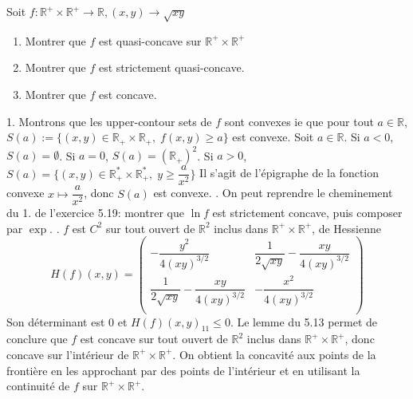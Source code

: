 \documentclass{fancybook}
\begin{document}
\begin{exercice}
Soit $f:\mathbb R^+\times \mathbb R^+\to \mathbb R, (x,y)\to \sqrt{xy}$
\begin{enumerate}
\item Montrer que $f$ est quasi-concave sur $\mathbb R^+\times \mathbb R^+$
\item Montrer que $f$ est strictement quasi-concave.
\item Montrer que $f$ est concave.
\end{enumerate} 
\end{exercice}
1. Montrons que les upper-contour sets de $f$ sont convexes ie que pour tout $a\in \mathbb R$, $S(a):=\{(x,y)\in \mathbb R_+\times \mathbb R_+,\; f(x,y)\geq a\}$ est convexe. \newline
Soit $a\in \mathbb R$. Si $a<0$, $S(a)=\emptyset$. Si $a=0$, $S(a)=(\mathbb R_+)^2$.\newline
Si $a>0$, $S(a)=\{(x,y)\in \mathbb R^*_+ \times \mathbb R^*_+, \; y\geq \dfrac{a}{x^2} \}$
Il s'agit de l'épigraphe de la fonction convexe $x\mapsto \dfrac{a}{x^2}$, donc $S(a)$ est convexe. \newline
{}. On peut reprendre le cheminement du 1. de l'exercice 5.19: montrer que $\ln f$ est strictement concave, puis composer par $\exp$. \newline
{}. $f$ est $C^2$ sur tout ouvert de $\mathbb R^2$ inclus dans $\mathbb R^+\times \mathbb R^+$, de Hessienne 
$$H(f)(x,y) = \left(
\begin{array}{cc}
 -\dfrac{y^2}{4 (x y)^{3/2}} & \dfrac{1}{2 \sqrt{x y}}-\dfrac{x y}{4 (x y)^{3/2}} \\
 \dfrac{1}{2 \sqrt{x y}}-\dfrac{x y}{4 (x y)^{3/2}} & -\dfrac{x^2}{4 (x y)^{3/2}} \\
\end{array}
\right)$$
Son déterminant est $0$ et $H(f)(x,y)_{11} \leq 0$. Le lemme du 5.13 permet de conclure que $f$ est concave sur tout ouvert de $\mathbb R^2$ inclus dans $\mathbb R^+\times \mathbb R^+$, donc concave sur l'intérieur de $\mathbb R^+\times \mathbb R^+$.\newline
On obtient la concavité aux points de la frontière en les approchant par des points de l'intérieur et en utilisant la continuité de $f$ sur $\mathbb R^+\times \mathbb R^+$.
\end{document}
